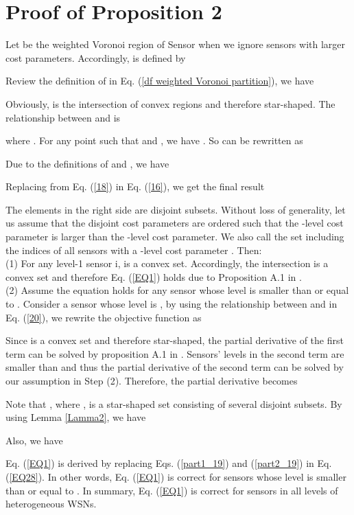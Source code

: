 \documentclass[journal,draftcls,onecolumn,12pt,twoside, narroweqnarray]{IEEEtran}
\begin{document}
\section{Proof of Proposition 2}
\begin{IEEEproof}
Let  be the weighted Voronoi region of Sensor  when we ignore sensors with larger cost parameters. Accordingly,  is defined by

Review the definition of  in Eq. (\ref{df weighted Voronoi partition}), we have

Obviously,  is the intersection of convex regions and therefore star-shaped. The relationship between  and  is

where .
For any point  such that  and , we have . So  can be rewritten as

Due to the definitions of  and , we have

Replacing  from Eq. (\ref{18}) in Eq. (\ref{16}), we get the final result

The elements in the right side are disjoint subsets.
Without loss of generality, let us assume that the  disjoint cost parameters are ordered such that the -level cost parameter is larger than the -level cost parameter. We also call the set including the indices of all sensors with a -level cost parameter . Then:  \\
(1) For any level-1 sensor i,  is a convex set. Accordingly, the intersection  is a convex set and therefore Eq. (\ref{EQ1}) holds due to Proposition A.1 in \cite{SD}.\\
(2) Assume the equation holds for any sensor whose level is smaller than or equal to . Consider a sensor  whose level is , by using the relationship between  and  in Eq. (\ref{20}), we rewrite the objective function as

Since  is a convex set and therefore star-shaped, the partial derivative of the first term can be solved by proposition A.1 in \cite{SD}. Sensors' levels in the second term are smaller than  and thus the partial derivative of the second term can be solved by our assumption in Step (2). Therefore, the partial derivative becomes

Note that
,
where ,
is a star-shaped set consisting of several disjoint subsets.
By using Lemma \ref{Lamma2}, we have

Also, we have

Eq. (\ref{EQ1}) is derived by replacing Eqs. (\ref{part1_19}) and (\ref{part2_19}) in Eq. (\ref{EQ28}).
In other words, Eq. (\ref{EQ1}) is correct for sensors whose level is smaller than or equal to .
In summary, Eq. (\ref{EQ1}) is correct for sensors in all levels of heterogeneous WSNs.
\end{IEEEproof}
\end{document}
